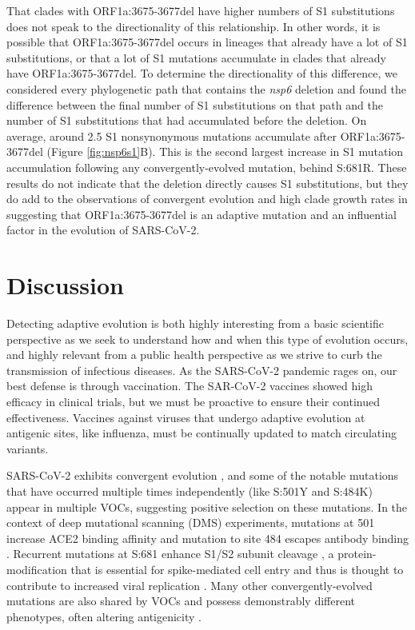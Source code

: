 \documentclass[11pt,oneside,letterpaper]{article}
\begin{document}
That clades with ORF1a:3675-3677del have higher numbers of S1 substitutions does not speak to the directionality of this relationship. 
In other words, it is possible that ORF1a:3675-3677del occurs in lineages that already have a lot of S1 substitutions, or that a lot of S1 mutations accumulate in clades that already have ORF1a:3675-3677del. 
To determine the directionality of this difference, we considered every phylogenetic path that contains the \emph{nsp6} deletion and found the difference between the final number of S1 substitutions on that path and the number of S1 substitutions that had accumulated before the deletion. 
On average, around 2.5 S1 nonsynonymous mutations accumulate after ORF1a:3675-3677del (Figure \ref{fig:nsp6s1}B). 
This is the second largest increase in S1 mutation accumulation following any convergently-evolved mutation, behind S:681R. 
These results do not indicate that the deletion directly causes S1 substitutions, but they do add to the observations of convergent evolution and high clade growth rates in suggesting that ORF1a:3675-3677del is an adaptive mutation and an influential factor in the evolution of SARS-CoV-2.



\section*{Discussion}
Detecting adaptive evolution is both highly interesting from a basic scientific perspective as we seek to understand how and when this type of evolution occurs, and highly relevant from a public health perspective as we strive to curb the transmission of infectious diseases. 
As the SARS-CoV-2 pandemic rages on, our best defense is through vaccination. 
The SAR-CoV-2 vaccines showed high efficacy in clinical trials, but we must be proactive to ensure their continued effectiveness. 
Vaccines against viruses that undergo adaptive evolution at antigenic sites, like influenza, must be continually updated to match circulating variants.

SARS-CoV-2 exhibits convergent evolution \cite{Van_Dorp2020-ox, Martin2021-lj, Rochman2021-sv}, and some of the notable mutations that have occurred multiple times independently (like S:501Y and S:484K) appear in multiple VOCs, suggesting positive selection on these mutations. 
In the context of deep mutational scanning (DMS) experiments, mutations at 501 increase ACE2 binding affinity \cite{Starr2020-bt} and mutation to site 484 escapes antibody binding \cite{Greaney2021-jn}. 
Recurrent mutations at S:681 enhance S1/S2 subunit cleavage \cite{Lubinski2021-ul, Liu2021-ne}, a protein-modification that is essential for spike-mediated cell entry \cite{Hoffmann2020-vi} and thus is thought to contribute to increased viral replication \cite{Liu2021-ne}. 
Many other convergently-evolved mutations are also shared by VOCs and possess demonstrably different phenotypes, often altering antigenicity \cite{Li2020-jd, McCarthy2021-lg, Wang2021-dm}.
\end{document}
